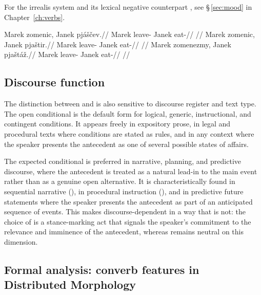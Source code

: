 For the irrealis system and its lexical negative counterpart ,
see §\,\ref{sec:mood} in Chapter~\ref{ch:verbs}.

\pex \label{ex:cond-irr}
\a
\begingl
\gla Marek zomenic, Janek pjáščev.//
\glb Marek leave-\Cond{} Janek eat-\Irr{}//
\glft {} //
\endgl
\a
\begingl
\gla Marek zomenic, Janek pjaštir.//
\glb Marek leave-\Cond{} Janek eat-\NIrr{}//
\glft {} //
\endgl
\a
\begingl
\gla Marek zomenezmy, Janek pjaštáž.//
\glb Marek leave-\ECond{} Janek eat-\Ctpl{}//
\glft {} //
\endgl
\xe

\subsection{Discourse function}\label{sec:cond-discourse}

The distinction between  and  is also sensitive to discourse
register and text type. The open conditional  is the default form for
logical, generic, instructional, and contingent conditions. It appears
freely in expository prose, in legal and procedural texts where conditions are
stated as rules, and in any context where the speaker presents the antecedent as
one of several possible states of affairs.

The expected conditional  is preferred in narrative, planning, and
predictive discourse, where the antecedent is treated as a natural lead-in to
the main event rather than as a genuine open alternative. It is
characteristically found in sequential narrative (), in procedural instruction (), and
in predictive future statements where the speaker presents the antecedent as
part of an anticipated sequence of events. This makes 
discourse-dependent in a way that  is not: the choice of  is
a stance-marking act that signals the speaker's commitment to the relevance and
imminence of the antecedent, whereas  remains neutral on this
dimension.

\subsection{Formal analysis: converb features in Distributed Morphology}\label{sec:cond-dm}

